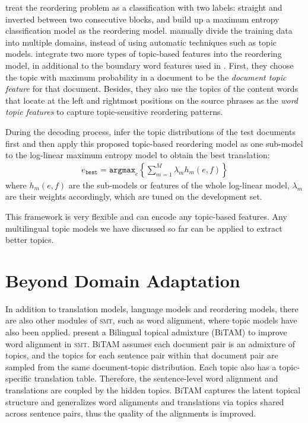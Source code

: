 \citet{Xiong-2006} treat the
reordering problem as a classification with two labels: straight and
inverted between two consecutive blocks, and build up a maximum
entropy classification model as the reordering model.
\citet{Chen-2013} manually divide the training data into
multiple domains, instead of using automatic techniques such as topic
models.
\citet{wang-14} integrate two more types of
topic-based features into the reordering model, in additional to the
boundary word features used in \citet{Xiong-2006}. First, they choose
the topic with maximum probability in a document to be the
\textit{document topic feature} for that document. Besides, they also
use the topics of the content words that locate at the left and
rightmost positions on the source phrases as the \textit{word topic
  features} to capture topic-sensitive reordering patterns.

During the decoding process, \citet{Xiong-2006} infer the topic
distributions of the test documents first and then apply this proposed
topic-based reordering model as one sub-model to the log-linear maximum entropy model
to obtain the best translation:
\begin{align}
e_\texttt{best} = \texttt{argmax}_e \left\{ \sum_{m=1}^M \lambda_m h_m(e,f) \right\}
\end{align}
where $h_m(e,f)$ are the sub-models or features of the whole
log-linear model, $\lambda_m$ are their weights accordingly, which are
tuned on the development set.

This framework is very flexible and can encode any topic-based features.
Any multilingual topic models we have discussed so far can be
applied to extract better topics.

\section{Beyond Domain Adaptation}

In addition to translation models, language models and reordering models,
there are also other modules of \textsc{smt}, such as word alignment,
where topic models have also been applied. \citet{zhao-06} present a
Bilingual topical admixture (BiTAM) to improve  word
alignment in \textsc{smt}. BiTAM assumes each document pair is an
admixture of topics, and the topics for each sentence pair within that
document pair are sampled from the same document-topic
distribution. Each topic also has a topic-specific translation
table. Therefore, the sentence-level word alignment and translations
are coupled by the hidden topics.  BiTAM captures the latent
topical structure and generalizes word alignments and translations via
topics shared across sentence pairs, thus the quality of the
alignments is improved.

